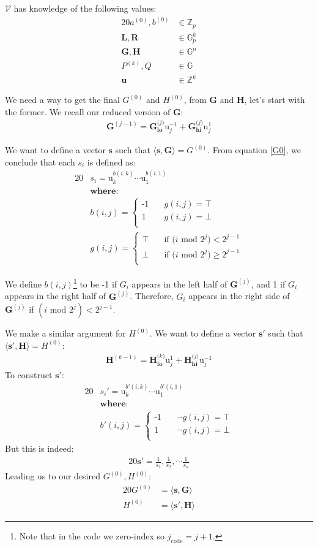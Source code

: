 \documentclass{article}
\newcommand{\eq}[1]{\begin{alignat*}{20}#1\end{alignat*}}
\newcommand{\eqn}[2]{\begin{equation}\label{#1}\begin{split}#2\end{split}\end{equation}}
\renewcommand{\vec}[1]{\boldsymbol{#1}}
\newcommand{\ran}[1]{\mathrm{#1}}
\newcommand{\vecran}[1]{\mathbf{#1}}
\newcommand{\V}{\mathcal{V}}
\newcommand{\G}{\mathbb{G}}
\newcommand{\Z}{\mathbb{Z}}
\newcommand{\dotp}[2]{\langle #1, #2 \rangle}
\newcommand{\opn}[1]{\operatorname{#1}}
\newcommand{\veclo}[1]{\vec{#1_{\opn{lo}}}}
\newcommand{\vechi}[1]{\vec{#1_{\opn{hi}}}}
\begin{document}
$\V$ has knowledge of the following values:
\eq{
	a^{(0)}, b^{(0)} &\in \Z_p \\
	\vec{L}, \vec{R} &\in \G_p^{k} \\
	\vec{G}, \vec{H} &\in \G^n \\
	P^{(k)}, Q &\in \G \\
	\vecran{u} &\in \Z^{k}
}

We need a way to get the final $G^{(0)}$ and $H^{(0)}$, from $\vec{G}$
and $\vec{H}$, let's start with the former. We recall our reduced
version of $\vec{G}$:
\eqn{G0}{
	\vec{G}^{(j-1)} = \veclo{G^\textit{(j)}} \ran{u}^{-1}_j + \vechi{G^\textit{(j)}} \ran{u}^{1}_j
}

We want to define a vector $\vec{s}$ such that $\dotp{\vec{s}}{\vec{G}}
= G^{(0)}$. From equation \ref{G0}, we conclude that each $s_i$ is
defined as:
\eq{
	&s_i = \ran{u}^{b(i,k)}_k \cdots \ran{u}^{b(i,1)}_1 \\
	&\textbf{where:} \\
	&b(i,j) = 
	\begin{cases}
		\text{-1} &\quad  g(i,j) = \top \\
		\text{1}  &\quad  g(i,j) = \bot \\
	\end{cases} \\
	&g(i,j) = 
	\begin{cases}
		\top &\quad  \text{if $(i$ mod $2^j) <    2^{j-1}$} \\
		\bot &\quad  \text{if $(i$ mod $2^j) \geq 2^{j-1}$} \\
	\end{cases}
}

We define $b(i,j)$\footnote{Note that in the code we zero-index
so $j_{\text{code}} = j+1$.} to be -1 if $G_i$ appears in the left
half of $\vec{G}^{(j)}$, and 1 if $G_i$ appears in the right half
of $\vec{G}^{(j)}$. Therefore, $G_i$ appears in the right side of
$\vec{G}^{(j)}$ if $(i \text{ mod } 2^j) < 2^{j-1}$.

We make a similar argument for $H^{(0)}$. We want to define a vector
$\vec{s'}$ such that $\dotp{\vec{s'}}{\vec{H}} = H^{(0)}$:
\eqn{H0}{
	\vec{H}^{(k-1)} = \veclo{H^\textit{(k)}} \ran{u}^{1}_j + \vechi{H^\textit{(j)}} \ran{u}^{-1}_j
}
To construct $\vec{s'}$:
\eq{
	&s_i' = \ran{u}^{b'(i,k)}_k \cdots \ran{u}^{b'(i,1)}_1 \\
	&\textbf{where:} \\
	&b'(i,j) = 
	\begin{cases}
		\text{-1} &\quad  \lnot g(i,j) = \top \\
		\text{1}  &\quad  \lnot g(i,j) = \bot \\
	\end{cases}
}
But this is indeed:
\eq{
	\vec{s'} = \frac{1}{s_1}, \frac{1}{s_2}, \cdots \frac{1}{s_n}
}
Leading us to our desired $G^{(0)}, H^{(0)}$:
\eq{
	G^{(0)} &= \dotp{\vec{s}}{\vec{G}} \\
	H^{(0)} &= \dotp{\vec{s'}}{\vec{H}}
}
\end{document}
